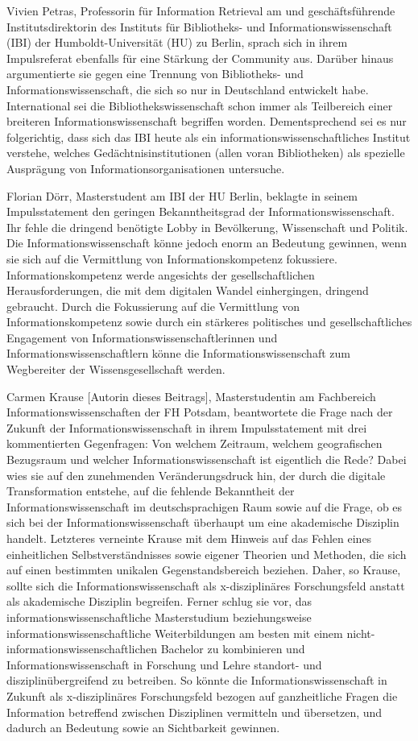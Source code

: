 \documentclass[a4paper,
fontsize=11pt,
oneside,
numbers=noperiodatend,
parskip=half-,
bibliography=totoc,
final
]{scrartcl}
\begin{document}
Vivien Petras, Professorin für Information Retrieval am und
geschäftsführende Institutsdirektorin des Instituts für Bibliotheks- und
Informationswissenschaft (IBI) der Humboldt-Universität (HU) zu Berlin,
sprach sich in ihrem Impulsreferat ebenfalls für eine Stärkung der
Community aus. Darüber hinaus argumentierte sie gegen eine Trennung von
Bibliotheks- und Informationswissenschaft, die sich so nur in
Deutschland entwickelt habe. International sei die
Bibliothekswissenschaft schon immer als Teilbereich einer breiteren
Informationswissenschaft begriffen worden. Dementsprechend sei es nur
folgerichtig, dass sich das IBI heute als ein
informationswissenschaftliches Institut verstehe, welches
Gedächtnisinstitutionen (allen voran Bibliotheken) als spezielle
Ausprägung von Informationsorganisationen untersuche.

Florian Dörr, Masterstudent am IBI der HU Berlin, beklagte in seinem
Impulsstatement den geringen Bekanntheitsgrad der
Informationswissenschaft. Ihr fehle die dringend benötigte Lobby in
Bevölkerung, Wissenschaft und Politik. Die Informationswissenschaft
könne jedoch enorm an Bedeutung gewinnen, wenn sie sich auf die
Vermittlung von Informationskompetenz fokussiere. Informationskompetenz
werde angesichts der gesellschaftlichen Herausforderungen, die mit dem
digitalen Wandel einhergingen, dringend gebraucht. Durch die
Fokussierung auf die Vermittlung von Informationskompetenz sowie durch
ein stärkeres politisches und gesellschaftliches Engagement von
Informationswissenschaftlerinnen und Informationswissenschaftlern könne
die Informationswissenschaft zum Wegbereiter der Wissensgesellschaft
werden.

Carmen Krause {[}Autorin dieses Beitrags{]}, Masterstudentin am
Fachbereich Informationswissenschaften der FH Potsdam, beantwortete die
Frage nach der Zukunft der Informationswissenschaft in ihrem
Impulsstatement mit drei kommentierten Gegenfragen: Von welchem
Zeitraum, welchem geografischen Bezugsraum und welcher
Informationswissenschaft ist eigentlich die Rede? Dabei wies sie auf den
zunehmenden Veränderungsdruck hin, der durch die digitale Transformation
entstehe, auf die fehlende Bekanntheit der Informationswissenschaft im
deutschsprachigen Raum sowie auf die Frage, ob es sich bei der
Informationswissenschaft überhaupt um eine akademische Disziplin
handelt. Letzteres verneinte Krause mit dem Hinweis auf das Fehlen eines
einheitlichen Selbstverständnisses sowie eigener Theorien und Methoden,
die sich auf einen bestimmten unikalen Gegenstandsbereich beziehen.
Daher, so Krause, sollte sich die Informationswissenschaft als
x-disziplinäres Forschungsfeld anstatt als akademische Disziplin
begreifen. Ferner schlug sie vor, das informationswissenschaftliche
Masterstudium beziehungsweise informationswissenschaftliche
Weiterbildungen am besten mit einem nicht-informationswissenschaftlichen
Bachelor zu kombinieren und Informationswissenschaft in Forschung und
Lehre standort- und disziplinübergreifend zu betreiben. So könnte die
Informationswissenschaft in Zukunft als x-disziplinäres Forschungsfeld
bezogen auf ganzheitliche Fragen die Information betreffend zwischen
Disziplinen vermitteln und übersetzen, und dadurch an Bedeutung sowie an
Sichtbarkeit gewinnen.
\end{document}
